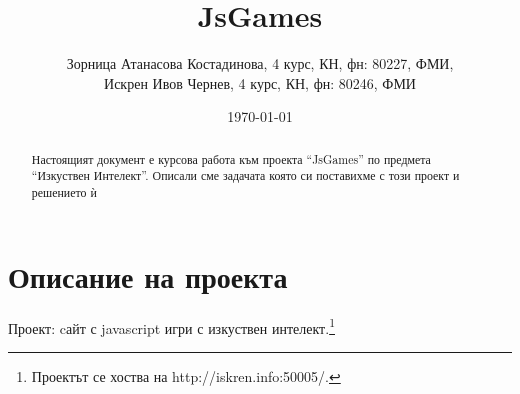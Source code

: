 \documentclass[a4paper]{article}
\def\jsg{JsGames}
\def\jsurl{http://iskren.info:50005/}
\begin{document}
\title{\jsg}
\author{
Зорница Атанасова Костадинова, 4 курс, КН, фн: 80227, ФМИ, \\
Искрен Ивов Чернев, 4 курс, КН, фн: 80246, ФМИ
}
\date{\today}
\maketitle


\begin{abstract}
Настоящият документ е курсова работа към проекта ``\jsg'' по предмета
``Изкуствен Интелект''. Описали сме задачата която си поставихме с този проект
и решението ѝ

\end{abstract}
\newpage

\setcounter{tocdepth}{2}
\tableofcontents
\newpage


\section{Описание на проекта}

Проект: cайт с javascript игри с изкуствен интелект.\footnote{Проектът се хоства на \jsurl.}
\end{document}
